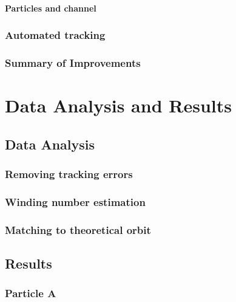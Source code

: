 \documentclass[]{report}
\begin{document}
\subsection{Particles and channel}




\section{Automated tracking}
     

\section{Summary of Improvements}



\part{Data Analysis and Results}
\chapter{Data Analysis}


\section{Removing tracking errors}


\section{Winding number estimation}


\section{Matching to theoretical orbit}




\chapter{Results}


\section{Particle A}

\newpage
\end{document}
